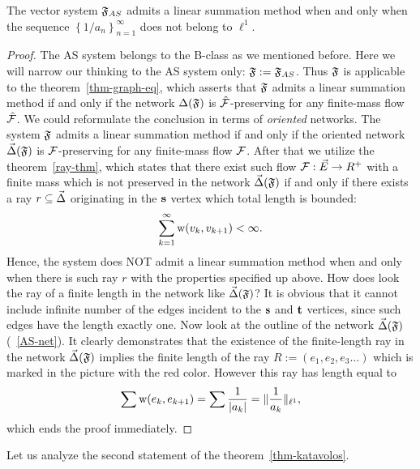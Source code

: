 \documentclass[12pt]{article}
\begin{document}
      \begin{prop}
          The vector system $\mathfrak{F}_{AS}$ admits a linear summation method when and only when
            the sequence $\left\{1/a_n\right\}_{n=1}^\infty$ does not belong to $\ell^1$.
      \end{prop}
      \begin{proof}
        The AS system belongs to the B-class as we mentioned before.
        Here we will narrow our thinking to the AS system only: $\mathfrak{F} := \mathfrak{F}_{AS}$.
        Thus $\mathfrak{F}$ is applicable to the theorem~\ref{thm-graph-eq}, which asserts
          that $\mathfrak{F}$ admits a linear summation method if and only if
          the network $\Delta(\mathfrak{F})$ is $\mathcal{\hat{F}}$-preserving for any
          finite-mass flow $\mathcal{\hat{F}}$.
        We could reformulate the conclusion in terms of \emph{oriented} networks.
        The system $\mathfrak{F}$ admits a linear summation method if and only if
          the oriented network $\vec{\Delta}(\mathfrak{F})$ is $\mathcal{F}$-preserving for any
          finite-mass flow $\mathcal{F}$.
        After that we utilize the theorem~\ref{ray-thm}, which states that there exist such
          flow $\mathcal{F}: \vec{E} \to R^{+}$ with a finite mass which is not preserved in
          the network $\vec{\Delta}(\mathfrak{F})$
          if and only if there exists a ray $r \subseteq \vec{\Delta} $ originating in the $\mathbf{s}$ vertex
          which total length is bounded:
          \[
            \sum_{k=1}^\infty \mathrm{w}(v_k, v_{k+1}) < \infty.
          \]
          Hence, the system does NOT admit a linear summation method when and only when there is such ray $r$
            with the properties specified up above.
          How does look the ray of a finite length in the network like $\vec{\Delta}(\mathfrak{F})$?
          It is obvious that it cannot include infinite number of the edges incident to the
            $\mathbf{s}$ and $\mathbf{t}$ vertices, since such edges have the length exactly one.
          Now look at the outline of the network $\vec{\Delta}(\mathfrak{F})$ (~\ref{AS-net}).
          It clearly demonstrates that
            the existence of the finite-length ray in the network $\vec{\Delta}(\mathfrak{F})$ implies
            the finite length of the ray $R:=(e_1,e_2,e_3\dots)$ which is marked in the picture with the red color.
          However this ray has length equal to
          \[
            \sum \mathrm{w}(e_k, e_{k+1}) = \sum \frac{1}{|a_k|} = \|\frac{1}{a_k}\|_{\ell^1},
          \]
          which ends the proof immediately.
      \end{proof}
      Let us analyze the second statement of the theorem~\ref{thm-katavolos}.
\end{document}
